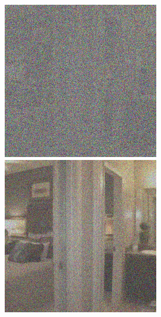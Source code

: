 \begin{figure}[H]
  \centering
  \begin{minipage}[b]{0.3\linewidth}
\includegraphics[width=\linewidth]{Picture/progress/random/x_0500.png}
  \end{minipage}
  \hspace{0.1cm} %
   \begin{minipage}[b]{0.3\linewidth}
    \includegraphics[width=\linewidth]{Picture/progress/random/x_0100.png}

\end{minipage}
\end{figure}
